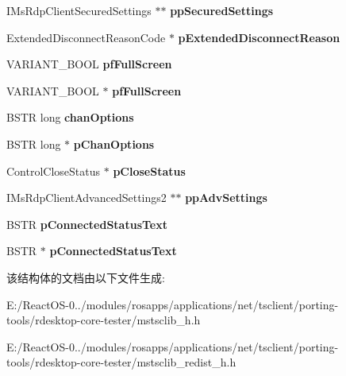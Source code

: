 \begin{DoxyCompactItemize}
I\+Ms\+Rdp\+Client\+Secured\+Settings $\ast$$\ast$ {\bfseries pp\+Secured\+Settings}
\item 
\mbox{\label{struct_i_ms_rdp_client2_vtbl_a9c60bb882a8de3ba9957273e533b497b}} 
Extended\+Disconnect\+Reason\+Code $\ast$ {\bfseries p\+Extended\+Disconnect\+Reason}
\item 
\mbox{\label{struct_i_ms_rdp_client2_vtbl_ab7f2fd0a64be9a8c1b9721c49e0fdf9e}} 
V\+A\+R\+I\+A\+N\+T\+\_\+\+B\+O\+OL {\bfseries pf\+Full\+Screen}
\item 
\mbox{\label{struct_i_ms_rdp_client2_vtbl_ae36da641990ada2ad33907f76de80214}} 
V\+A\+R\+I\+A\+N\+T\+\_\+\+B\+O\+OL $\ast$ {\bfseries pf\+Full\+Screen}
\item 
\mbox{\label{struct_i_ms_rdp_client2_vtbl_a32d87a069ac2f37b797bdf1eba95ce21}} 
B\+S\+TR long {\bfseries chan\+Options}
\item 
\mbox{\label{struct_i_ms_rdp_client2_vtbl_aff5899b9920e8d0f79c3605cbd386f13}} 
B\+S\+TR long $\ast$ {\bfseries p\+Chan\+Options}
\item 
\mbox{\label{struct_i_ms_rdp_client2_vtbl_a7119cebc97a87e585177964070cd9772}} 
Control\+Close\+Status $\ast$ {\bfseries p\+Close\+Status}
\item 
\mbox{\label{struct_i_ms_rdp_client2_vtbl_a40f9c7f079c740d7cd878846c7d6bc76}} 
I\+Ms\+Rdp\+Client\+Advanced\+Settings2 $\ast$$\ast$ {\bfseries pp\+Adv\+Settings}
\item 
\mbox{\label{struct_i_ms_rdp_client2_vtbl_a3b0b6ff27bccdd2f0e4819be3b355bd9}} 
B\+S\+TR {\bfseries p\+Connected\+Status\+Text}
\item 
\mbox{\label{struct_i_ms_rdp_client2_vtbl_a6620121215811ae253cb033ade0e0682}} 
B\+S\+TR $\ast$ {\bfseries p\+Connected\+Status\+Text}
\end{DoxyCompactItemize}


该结构体的文档由以下文件生成\+:\begin{DoxyCompactItemize}
\item 
E\+:/\+React\+O\+S-\/0../modules/rosapps/applications/net/tsclient/porting-\/tools/rdesktop-\/core-\/tester/mstsclib\+\_\+h.\+h\item 
E\+:/\+React\+O\+S-\/0../modules/rosapps/applications/net/tsclient/porting-\/tools/rdesktop-\/core-\/tester/mstsclib\+\_\+redist\+\_\+h.\+h\end{DoxyCompactItemize}

